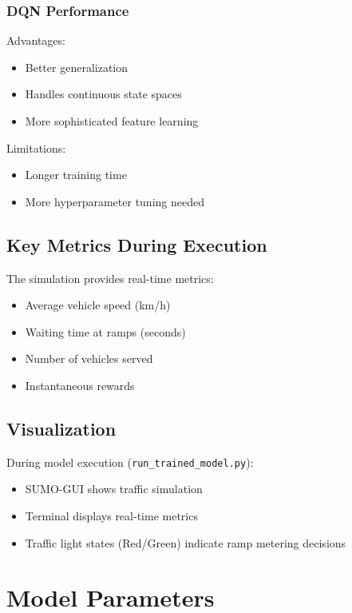 \documentclass[12pt,a4paper]{article}
\begin{document}
\subsubsection{DQN Performance}
\begin{tcolorbox}[title=DQN Analysis]
Advantages:
\begin{itemize}
    \item Better generalization
    \item Handles continuous state spaces
    \item More sophisticated feature learning
\end{itemize}
Limitations:
\begin{itemize}
    \item Longer training time
    \item More hyperparameter tuning needed
\end{itemize}
\end{tcolorbox}

\subsection{Key Metrics During Execution}
The simulation provides real-time metrics:
\begin{itemize}
    \item Average vehicle speed (km/h)
    \item Waiting time at ramps (seconds)
    \item Number of vehicles served
    \item Instantaneous rewards
\end{itemize}

\subsection{Visualization}
During model execution (\texttt{run\_trained\_model.py}):
\begin{itemize}
    \item SUMO-GUI shows traffic simulation
    \item Terminal displays real-time metrics
    \item Traffic light states (Red/Green) indicate ramp metering decisions
\end{itemize}

\section{Model Parameters}
\end{document}
